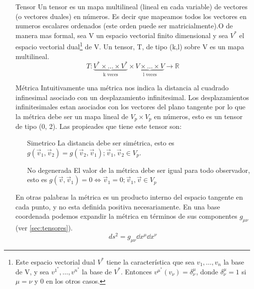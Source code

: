 \documentclass[../Main.tex]{subfiles}
\begin{document}
\begin{itemize}
    \item [Tensor]
    Un tensor es un mapa multilineal (lineal en cada variable) de vectores (o vectores duales) en números. Es decir que mapeamos todos los vectores en numeros escalares ordenados (este orden puede ser matricialmente).O de manera mas formal, sea V un espacio vectorial finito dimensional y sea $V^{*}$ el espacio vectorial dual\footnote{Este espacio vectorial dual $V^{*}$ tiene la característica que sea $v_{1}, \dots, v_{n}$ la base de V, y sea $v^{1^{*}}, \dots, v^{n^{*}}$ la base de $V^{*}$. Entonces $v^{\mu^{*}}(v_{\nu})=\delta^{\mu}_{\nu}$, donde $\delta^{\mu}_{\nu}=1$ si $\mu=\nu$ y 0 en los otros casos.} de V. Un tensor, T, de tipo (k,l) sobre V es un mapa multilineal.
    \begin{equation}
        T: \underbrace{V^{*}\times\dots\times V^{*}}_\text{k veces} \times \underbrace{V \times \dots \times V}_\text{l veces} \rightarrow \mathbb{R}
    \end{equation}
    \item [Métrica]
    Intuitivamente una métrica nos indica la distancia al cuadrado infinesimal asociado con un desplazamiento infinitesimal. Los desplazamientos infinitesimales estan asociados con los vectores del plano tangente por lo que la métrica debe ser un mapa lineal de $V_{p}\times V_{p}$ en números, esto es un tensor de tipo (0, 2). Las propieades que tiene este tensor son:
    \begin{itemize}
        \item [Simetrico]
        La distancia debe ser simétrica, esto es $g(\vec{v}_{1}, \vec{v}_{2})=g(\vec{v}_{2}, \vec{v}_{1}); \vec{v}_{1}, \vec{v}_{2} \in V_{p}$.
        \item [No degenerada]
        El valor de la métrica debe ser igual para todo observador, esto es $g(\vec{v},\vec{v}_{1})=0 \Leftrightarrow \vec{v}_{1}=0; \vec{v}_{1}, \vec{v} \in V_{p}$
    \end{itemize}
    En otras palabras la métrica es un producto interno del espacio tangente en cada punto, y no esta definida positiva necesariamente. En una base coordenada podemos expandir la métrica en términos de sus componentes $g_{\mu\nu}$ (ver \ref{sec:tensores}).
    \begin{equation}
        ds^{2} = g_{\mu\nu} \dd{x}^{\mu}\dd{x}^{\nu}
    \end{equation}
\end{itemize}
\end{document}
